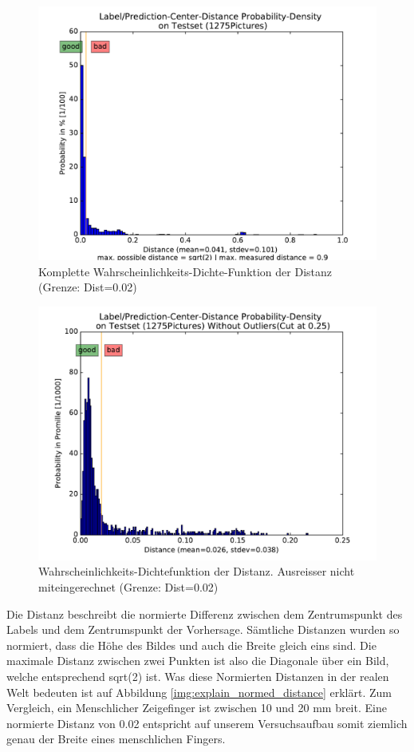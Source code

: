 \documentclass[a4paper,12pt]{article}
\begin{document}
\begin{figure}	
	\centering
	\includegraphics[width=.7\textwidth]{BilderResultate/distProbDensity.pdf}
	\caption{Komplette Wahrscheinlichkeits-Dichte-Funktion der Distanz (Grenze: Dist=0.02)}
	\label{img:dist_dichte}
\end{figure}
\begin{figure}	
	\centering
	\includegraphics[width=.7\textwidth]{BilderResultate/distProbDensity_improved.pdf}
	\caption{Wahrscheinlichkeits-Dichtefunktion der Distanz. Ausreisser nicht miteingerechnet (Grenze: Dist=0.02)}
	\label{img:dist_dichte_improved}
\end{figure}

Die Distanz beschreibt die normierte Differenz zwischen dem Zentrumspunkt des Labels und dem Zentrumspunkt der Vorhersage. 
Sämtliche Distanzen wurden so normiert, dass die Höhe des Bildes und auch die Breite gleich eins sind. 
Die maximale Distanz zwischen zwei Punkten ist also die Diagonale über ein Bild, welche entsprechend sqrt(2) ist.
Was diese Normierten Distanzen in der realen Welt bedeuten ist auf Abbildung \ref{img:explain_normed_distance} erklärt. 
Zum Vergleich, ein Menschlicher Zeigefinger ist zwischen 10 und 20 mm breit.
Eine normierte Distanz von 0.02 entspricht auf unserem Versuchsaufbau somit ziemlich genau der Breite eines menschlichen Fingers. 
\end{document}
